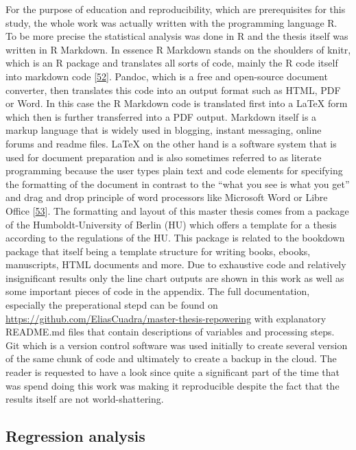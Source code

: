 \documentclass[a4paper,11pt]{article}
\begin{document}
For the purpose of education and reproducibility, which are prerequisites for this study, the whole work was actually written with the programming language R. To be more precise the statistical analysis was done in R and the thesis itself was written in R Markdown. In essence R Markdown stands on the shoulders of knitr, which is an R package and translates all sorts of code, mainly the R code itself into markdown code {[}\protect\hyperlink{ref-YihuiXieJ.J.AllaireGarrettGrolemund.2021}{52}{]}. Pandoc, which is a free and open-source document converter, then translates this code into an output format such as HTML, PDF or Word. In this case the R Markdown code is translated first into a LaTeX form which then is further transferred into a PDF output. Markdown itself is a markup language that is widely used in blogging, instant messaging, online forums and readme files. LaTeX on the other hand is a software system that is used for document preparation and is also sometimes referred to as literate programming because the user types plain text and code elements for specifying the formatting of the document in contrast to the ``what you see is what you get'' and drag and drop principle of word processors like Microsoft Word or Libre Office {[}\protect\hyperlink{ref-LaTeX.2021}{53}{]}. The formatting and layout of this master thesis comes from a package of the Humboldt-University of Berlin (HU) which offers a template for a thesis according to the regulations of the HU. This package is related to the bookdown package that itself being a template structure for writing books, ebooks, manuscripts, HTML documents and more. Due to exhaustive code and relatively insignificant results only the line chart outputs are shown in this work as well as some important pieces of code in the appendix. The full documentation, especially the preperational stepd can be found on \url{https://github.com/EliasCuadra/master-thesis-repowering} with explanatory README.md files that contain descriptions of variables and processing steps. Git which is a version control software was used initially to create several version of the same chunk of code and ultimately to create a backup in the cloud. The reader is requested to have a look since quite a significant part of the time that was spend doing this work was making it reproducible despite the fact that the results itself are not world-shattering.

\hypertarget{regression-analysis}{%
\subsection{Regression analysis}\label{regression-analysis}}
\end{document}
